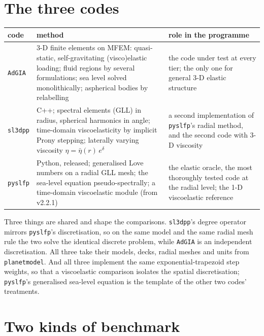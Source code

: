 \documentclass[11pt]{article}
\numberwithin{equation}{section}
\newcommand{\code}[1]{\texttt{#1}}
\begin{document}
\section{The three codes}
\label{sec:codes}

\begin{center}
\small
\begin{tabular}{@{}lP{6.2cm}P{6.3cm}@{}}
\toprule
code & method & role in the programme \\
\midrule
\code{AdGIA} & 3-D finite elements on MFEM: quasi-static, self-gravitating
(visco)elastic loading; fluid regions by several formulations; sea level
solved monolithically; aspherical bodies by relabelling &
the code under test at every tier; the only one for general 3-D elastic
structure \\
\code{sl3dpp} & C++; spectral elements (GLL) in radius, spherical
harmonics in angle; time-domain viscoelasticity by implicit Prony
stepping; laterally varying viscosity $\eta=\bar\eta(r)\,e^{\delta}$ &
a second implementation of \code{pyslfp}'s radial method, and the second
code with 3-D viscosity \\
\code{pyslfp} & Python, released; generalised Love numbers on a radial
GLL mesh; the sea-level equation pseudo-spectrally; a time-domain
viscoelastic module (from v2.2.1) &
the elastic oracle, the most thoroughly tested code at the radial level;
the 1-D viscoelastic reference \\
\bottomrule
\end{tabular}
\end{center}

\noindent Three things are shared and shape the comparisons.
\code{sl3dpp}'s degree operator mirrors \code{pyslfp}'s discretisation, so
on the same model and the same radial mesh rule the two solve the identical
discrete problem, while \code{AdGIA} is an independent discretisation. All
three take their models, decks, radial meshes and units from
\code{planetmodel}. And all three implement the same exponential-trapezoid
step weights, so that a viscoelastic comparison isolates the spatial
discretisation; \code{pyslfp}'s generalised sea-level equation is the
template of the other two codes' treatments.

\section{Two kinds of benchmark}
\label{sec:kinds}
\end{document}
